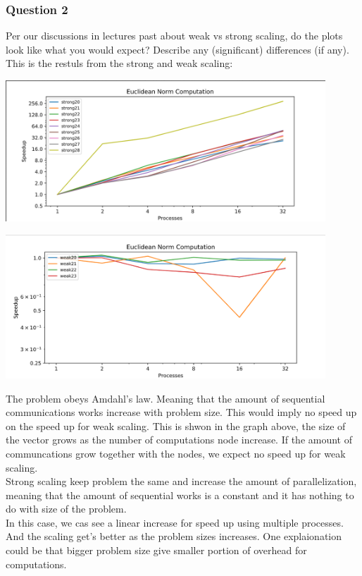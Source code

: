 \documentclass[]{article}
\begin{document}
        \subsubsection*{Question 2}
            Per our discussions in lectures past about weak vs strong scaling, do the plots look like what you would expect? Describe any (significant) differences (if any).
            \\[1.1em]
            This is the restuls from the strong and weak scaling: 
            \begin{center}
                \includegraphics*[width=12cm]{norm_strong_scale.png}
            \end{center}
            \begin{center}
                \includegraphics*[width=12cm]{weak_norm.png}
            \end{center}
            The problem obeys Amdahl's law. Meaning that the amount of sequential communications works increase with problem size. This would imply no speed up on the speed up for weak scaling. This is shwon in the graph above, the size of the vector grows as the number of computations node increase. If the amount of communcations grow together with the nodes, we expect no speed up for weak scaling. 
            \\
            Strong scaling keep problem the same and increase the amount of parallelization, meaning that the amount of sequential works is a constant and it has nothing to do with size of the problem. 
            \\
            In this case, we cas see a linear increase for speed up using multiple processes. And the scaling get's better as the problem sizes increases. One explaionation could be that bigger problem size give smaller portion of overhead for computations. 
\end{document}
